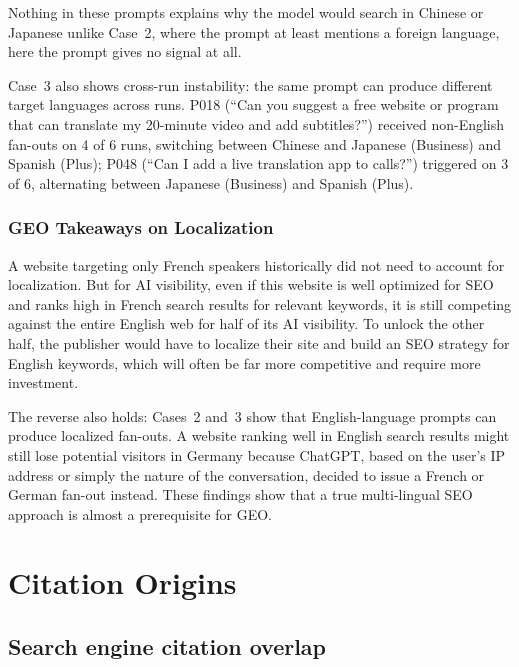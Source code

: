 \noindent Nothing in these prompts explains why the model would search in Chinese or Japanese unlike Case~2, where the prompt at least mentions a foreign language, here the prompt gives no signal at all.

Case~3 also shows cross-run instability: the same prompt can produce different target languages across runs. 
P018 (``Can you suggest a free website or program that can translate my 20-minute video and add subtitles?'') 
received non-English fan-outs on 4 of 6 runs, switching between Chinese and Japanese (Business)
and Spanish (Plus); P048 (``Can I add a live translation app to calls?'') triggered on 3 of 6, 
alternating between Japanese (Business) and Spanish (Plus). 

\subsubsection{GEO Takeaways on Localization}
 
A website targeting only French speakers historically did not need to account for localization. 
But for AI visibility, even if this website is well optimized for SEO and ranks high in French search results for relevant keywords, it is still competing against the entire English web for half of its AI visibility. To unlock the other half, the publisher would have to
 localize their site and build an SEO strategy for English keywords, which will often be far more competitive and require more investment.

The reverse also holds: Cases~2 and~3 show that English-language prompts can produce localized fan-outs. A website ranking well in English search results might still lose potential visitors in Germany because ChatGPT, based on the user's IP address or simply the nature of the conversation, decided to issue a French or German fan-out instead. These findings show that a true multi-lingual SEO approach is almost a prerequisite for GEO.

\section{Citation Origins}
\label{sec:position-bias}
\label{sec:citation-overlap}


\subsection{Search engine citation overlap}
\label{sec:global-overlap}

